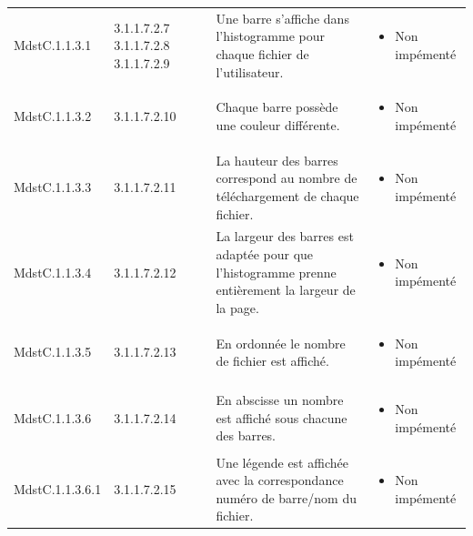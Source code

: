 \documentclass[10pt,a4paper,landscape]{report}
\begin{document}
\begin{center}
\begin{tabular}{|p{2.5cm}|p{2cm}|p{8cm}|p{8cm}|p{5cm}|}
\\
		\cline{1-2}\cline{4-5}
		MdstC.1.1.3.1 & 3.1.1.7.2.7 3.1.1.7.2.8 3.1.1.7.2.9 & & Une barre s'affiche dans l'histogramme pour chaque fichier de l'utilisateur. &\vspace*{-0.2cm} \begin{itemize}[label=$\ast$] \item \textcolor{false}{Non impémenté}\end{itemize}
\\
		\cline{1-2}\cline{4-5}
		MdstC.1.1.3.2 & 3.1.1.7.2.10 & & Chaque barre possède une couleur différente. &\vspace*{-0.2cm} \begin{itemize}[label=$\ast$] \item \textcolor{false}{Non impémenté}\end{itemize}
\\
		\cline{1-2}\cline{4-5}
		MdstC.1.1.3.3 & 3.1.1.7.2.11 & & La hauteur des barres correspond au nombre de téléchargement de chaque fichier. &\vspace*{-0.2cm} \begin{itemize}[label=$\ast$] \item \textcolor{false}{Non impémenté}\end{itemize}
\\
		\cline{1-2}\cline{4-5}
		MdstC.1.1.3.4 & 3.1.1.7.2.12 & & La largeur des barres est adaptée pour que l'histogramme prenne entièrement la largeur de la page. &\vspace*{-0.2cm} \begin{itemize}[label=$\ast$] \item \textcolor{false}{Non impémenté}\end{itemize}
\\
		\cline{1-2}\cline{4-5}
		MdstC.1.1.3.5 & 3.1.1.7.2.13 & & En ordonnée le nombre de fichier est affiché. &\vspace*{-0.2cm} \begin{itemize}[label=$\ast$] \item \textcolor{false}{Non impémenté}\end{itemize}
\\
		\cline{1-2}\cline{4-5}
		MdstC.1.1.3.6 & 3.1.1.7.2.14 & & En abscisse un nombre est affiché sous chacune des barres. &\vspace*{-0.2cm} \begin{itemize}[label=$\ast$] \item \textcolor{false}{Non impémenté}\end{itemize}
\\
		\cline{1-2}\cline{4-5}
		MdstC.1.1.3.6.1 & 3.1.1.7.2.15 & & Une légende est affichée avec la correspondance numéro de barre/nom du fichier. &\vspace*{-0.2cm} \begin{itemize}[label=$\ast$] \item \textcolor{false}{Non impémenté}\end{itemize}
\\
		\hline
	\end{tabular}
	\egroup
\end{center}
\end{document}
